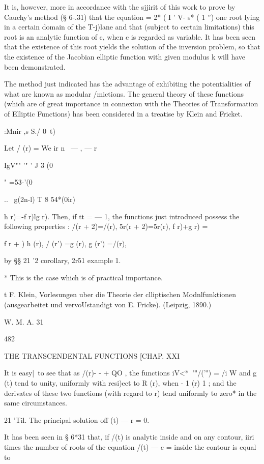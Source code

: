 It is, however, more in accordance with the sjjirit of this work to
prove by Cauchy's method (§ 6-.31) that the equation = 2* ( I ' V- s*
( 1 '') one root lying in a certain domain of the T-j)lane and that
(subject to certain limitations) this root is an analytic function of
c, when c is regarded as variable. It has been seen that the existence
of this root yields the solution of the inversion problem, so that the
existence of the Jacobian elliptic function with given modulus k will
have been demonstrated.

The method just indicated has the advantage of exhibiting the
potentialities of what are known as modular /mictions. The general
theory of these functions (which are of great importance in connexion
with the Theories of Transformation of Elliptic Functions) has been
considered in a treatise by Klein and Fricket.

:Mnir ,s S./ 0\ t)

Let / (r) = We ir n \ — , — r \

IgV"" '" ' J 3 (0

" =53-'(0

.. \ g(2n-l) T 8 54*(0ir)

h r)=-f r)lg r). Then, if tt = — 1, the functions just introduced
possess the following properties : /(r + 2)=/(r), 5r(r + 2)=5r(r), f
r)+g r) = \,

f r + ) h (r), / (r') =g (r), g (r') =/(r),

by §§ 21 '2 corollary, 2r51 example 1.

* This is the case which is of practical importance.

t F. Klein, Vorlesungen uber die Theorie der clliptischen
Modnlfunktionen (ausgearbeitet und vervoUstandigt von E. Fricke).
(Leipzig, 1890.)

W. M. A. 31

482

THE TRANSCENDENTAL FUNCTIONS [CHAP. XXI

It is easy|\ to see that as /(r)- - + QO , the functions iV<*~""/('")
= /i W and g (t) tend to unity, uniformly with resi)ect to R (r), when
- 1 (r) 1 ; and the derivates of these two functions (with regard to
r) tend uniformly to zero* in the same circumstances.

21 'Til. The principal solution off (t) — r = 0.

It has been seen in § 6*31 that, if /(t) is analytic inside and on any
contour, iiri times the number of roots of the equation /(t) — c =
inside the contour is equal to

